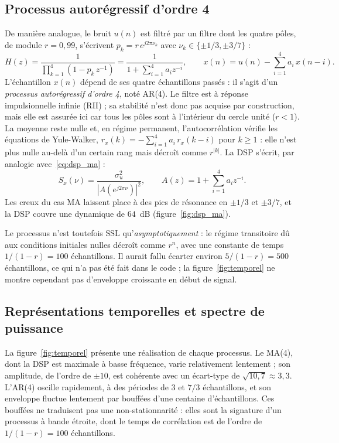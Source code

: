 \documentclass[11pt,a4paper]{article}
\begin{document}
\subsection{Processus autorégressif d'ordre 4}

De manière analogue, le bruit $u(n)$ est filtré par un filtre dont les quatre pôles, de module $r = 0{,}99$, s'écrivent $p_k = r\, e^{j2\pi\nu_k}$ avec $\nu_k \in \{\pm 1/3, \pm 3/7\}$ :
\begin{equation}
  H(z) = \frac{1}{\prod_{k=1}^{4} \left( 1 - p_k\, z^{-1} \right)} = \frac{1}{1 + \sum_{i=1}^{4} a_i z^{-i}},
  \qquad
  x(n) = u(n) - \sum_{i=1}^{4} a_i\, x(n-i).
  \label{eq:ar4}
\end{equation}
L'échantillon $x(n)$ dépend de ses quatre échantillons passés : il s'agit d'un \emph{processus autorégressif d'ordre 4}, noté AR(4). Le filtre est à réponse impulsionnelle infinie (RII) ; sa stabilité n'est donc pas acquise par construction, mais elle est assurée ici car tous les pôles sont à l'intérieur du cercle unité ($r < 1$). La moyenne reste nulle et, en régime permanent, l'autocorrélation vérifie les équations de Yule-Walker, $r_x(k) = -\sum_{i=1}^{4} a_i\, r_x(k-i)$ pour $k \geq 1$ : elle n'est plus nulle au-delà d'un certain rang mais décroît comme $r^{|k|}$. La DSP s'écrit, par analogie avec~\eqref{eq:dsp_ma} :
\begin{equation}
  S_x(\nu) = \frac{\sigma_u^2}{\left| A\!\left(e^{j2\pi\nu}\right) \right|^2},
  \qquad A(z) = 1 + \sum_{i=1}^{4} a_i z^{-i}.
  \label{eq:dsp_ar}
\end{equation}
Les creux du cas MA laissent place à des pics de résonance en $\pm 1/3$ et $\pm 3/7$, et la DSP couvre une dynamique de $64$~dB (figure~\ref{fig:dsp_ma}).

Le processus n'est toutefois SSL qu'\emph{asymptotiquement} : le régime transitoire dû aux conditions initiales nulles décroît comme $r^n$, avec une constante de temps $1/(1-r) = 100$ échantillons. Il aurait fallu écarter environ $5/(1-r) = 500$ échantillons, ce qui n'a pas été fait dans le code ; la figure~\ref{fig:temporel} ne montre cependant pas d'enveloppe croissante en début de signal.

\subsection{Représentations temporelles et spectre de puissance}

La figure~\ref{fig:temporel} présente une réalisation de chaque processus. Le MA(4), dont la DSP est maximale à basse fréquence, varie relativement lentement ; son amplitude, de l'ordre de $\pm 10$, est cohérente avec un écart-type de $\sqrt{10{,}7} \approx 3{,}3$. L'AR(4) oscille rapidement, à des périodes de 3 et $7/3$ échantillons, et son enveloppe fluctue lentement par bouffées d'une centaine d'échantillons. Ces bouffées ne traduisent pas une non-stationnarité : elles sont la signature d'un processus à bande étroite, dont le temps de corrélation est de l'ordre de $1/(1-r) = 100$ échantillons.
\end{document}
